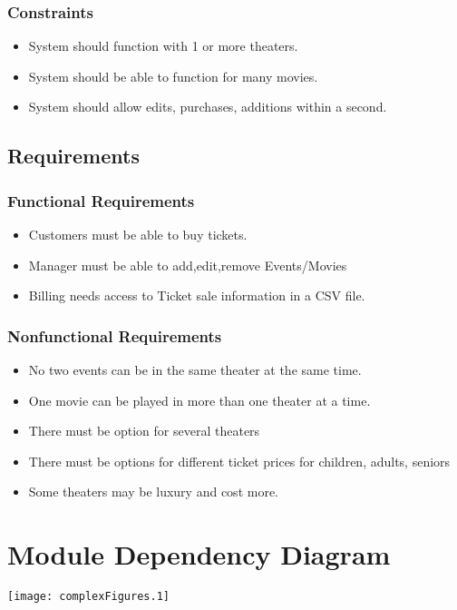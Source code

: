 \documentclass[12pt,titlepage,letterpaper]{article}
\begin{document}
\subsubsection{Constraints}
\begin{itemize}
\item System should function with 1 or more theaters.
\item System should be able to function for many movies.
\item System should allow edits, purchases, additions within a second.
\end{itemize}

\subsection{Requirements}
\subsubsection{Functional Requirements}
\begin{itemize}
\item Customers must be able to buy tickets.
\item Manager must be able to add,edit,remove Events/Movies
\item Billing needs access to Ticket sale information in a CSV file.
\end{itemize}

\subsubsection{Nonfunctional Requirements}
\begin{itemize}
\item No two events can be in the same theater at the same time.
\item One movie can be played in more than one theater at a time.
\item There must be option for several theaters
\item There must be options for different ticket prices for children, adults, seniors
\item Some theaters may be luxury and cost more.
\end{itemize}

\section{Module Dependency Diagram}
\begin{center}
\texttt{[image: complexFigures.1]}
\end{center}
\end{document}
